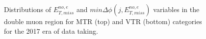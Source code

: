 \begin{figure}[htbp]
{    }
  \caption{Distributions of $E_{T,miss}^{no,e}$ and $min\Delta\phi(j,E_{T,miss}^{no,e})$ variables in the double muon region for MTR (top) and VTR (bottom) categories for the 2017 era of data taking.}
  \label{fig:2017_Zee_2}
\end{figure}


